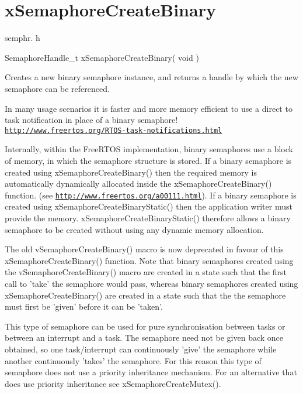 \hypertarget{group__xSemaphoreCreateBinary}{\section{x\-Semaphore\-Create\-Binary}
\label{group__xSemaphoreCreateBinary}
}
semphr. h 
\begin{DoxyPre}SemaphoreHandle\_t xSemaphoreCreateBinary( void )\end{DoxyPre}


Creates a new binary semaphore instance, and returns a handle by which the new semaphore can be referenced.

In many usage scenarios it is faster and more memory efficient to use a direct to task notification in place of a binary semaphore! \href{http://www.freertos.org/RTOS-task-notifications.html}{\tt http\-://www.\-freertos.\-org/\-R\-T\-O\-S-\/task-\/notifications.\-html}

Internally, within the Free\-R\-T\-O\-S implementation, binary semaphores use a block of memory, in which the semaphore structure is stored. If a binary semaphore is created using x\-Semaphore\-Create\-Binary() then the required memory is automatically dynamically allocated inside the x\-Semaphore\-Create\-Binary() function. (see \href{http://www.freertos.org/a00111.html}{\tt http\-://www.\-freertos.\-org/a00111.\-html}). If a binary semaphore is created using x\-Semaphore\-Create\-Binary\-Static() then the application writer must provide the memory. x\-Semaphore\-Create\-Binary\-Static() therefore allows a binary semaphore to be created without using any dynamic memory allocation.

The old v\-Semaphore\-Create\-Binary() macro is now deprecated in favour of this x\-Semaphore\-Create\-Binary() function. Note that binary semaphores created using the v\-Semaphore\-Create\-Binary() macro are created in a state such that the first call to 'take' the semaphore would pass, whereas binary semaphores created using x\-Semaphore\-Create\-Binary() are created in a state such that the the semaphore must first be 'given' before it can be 'taken'.

This type of semaphore can be used for pure synchronisation between tasks or between an interrupt and a task. The semaphore need not be given back once obtained, so one task/interrupt can continuously 'give' the semaphore while another continuously 'takes' the semaphore. For this reason this type of semaphore does not use a priority inheritance mechanism. For an alternative that does use priority inheritance see x\-Semaphore\-Create\-Mutex().

